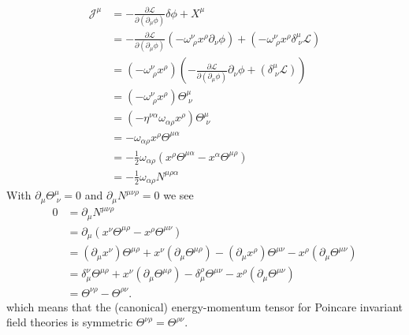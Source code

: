 \documentclass[10pt,a4paper]{book}
\theoremstyle{definition}
\begin{document}
\begin{align}
    \mathcal{J}^\mu&=-\frac{\partial\mathcal{L}}{\partial(\partial_\mu\phi)}\delta\phi+X^\mu\\
    &=-\frac{\partial\mathcal{L}}{\partial(\partial_\mu\phi)}(-\omega^\nu_{\;\rho}x^\rho\partial_\nu\phi)+(-\omega^\nu_{\;\rho}x^\rho\delta^\mu_{\;\nu}\mathcal{L})\\
    &=(-\omega^\nu_{\;\rho}x^\rho)\left(-\frac{\partial\mathcal{L}}{\partial(\partial_\mu\phi)}\partial_\nu\phi+(\delta^\mu_{\;\nu}\mathcal{L})\right)\\
    &=(-\omega^\nu_{\;\rho}x^\rho)\Theta^\mu_{\;\nu}\\
    &=(-\eta^{\nu\alpha}\omega_{\alpha\rho}x^\rho)\Theta^\mu_{\;\nu}\\
    &=-\omega_{\alpha\rho}x^\rho\Theta^{\mu\alpha}\\
    &=-\frac{1}{2}\omega_{\alpha\rho}(x^\rho\Theta^{\mu\alpha}-x^\alpha\Theta^{\mu\rho})\\
    &=-\frac{1}{2}\omega_{\alpha\rho}N^{\mu\rho\alpha}
\end{align}
With $\partial_\mu\Theta^\mu_{\;\nu}=0$ and $\partial_\mu N^{\mu\nu\rho}=0$ we see
\begin{align}
    0&=\partial_\mu N^{\mu\nu\rho}\\
    &= \partial_\mu\left( x^\nu\Theta^{\mu\rho}-x^\rho\Theta^{\mu\nu}\right)\\
    &= (\partial_\mu x^\nu) \Theta^{\mu\rho}+  x^\nu (\partial_\mu \Theta^{\mu\rho}) -(\partial_\mu x^\rho)\Theta^{\mu\nu} - x^\rho (\partial_\mu\Theta^{\mu\nu})\\
    &= \delta_\mu^\nu \Theta^{\mu\rho}+  x^\nu (\partial_\mu \Theta^{\mu\rho}) -\delta_\mu^\rho\Theta^{\mu\nu} - x^\rho (\partial_\mu\Theta^{\mu\nu})\\
    &= \Theta^{\nu\rho} - \Theta^{\rho\nu}.
\end{align}
which means that the (canonical) energy-momentum tensor for Poincare invariant field theories is symmetric $\Theta^{\nu\rho} = \Theta^{\rho\nu}$.
\end{document}
